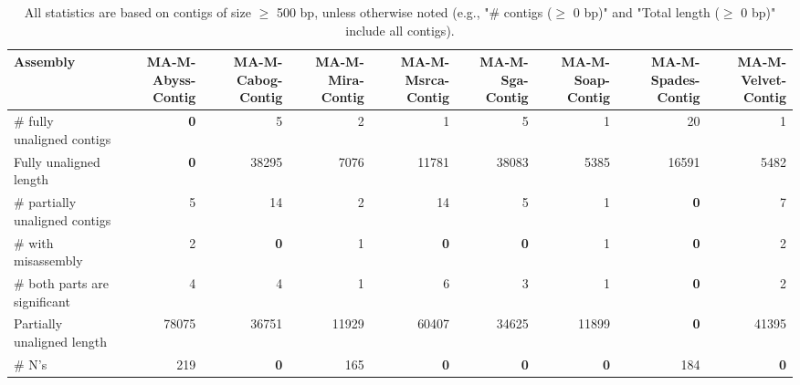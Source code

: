 \documentclass[12pt,a4paper]{article}
\begin{document}
\begin{table}[ht]
\begin{center}
\caption{All statistics are based on contigs of size $\geq$ 500 bp, unless otherwise noted (e.g., "\# contigs ($\geq$ 0 bp)" and "Total length ($\geq$ 0 bp)" include all contigs).}
\begin{tabular}{|l*{8}{|r}|}
\hline
Assembly & MA-M-Abyss-Contig & MA-M-Cabog-Contig & MA-M-Mira-Contig & MA-M-Msrca-Contig & MA-M-Sga-Contig & MA-M-Soap-Contig & MA-M-Spades-Contig & MA-M-Velvet-Contig \\ \hline
\# fully unaligned contigs & {\bf 0} & 5 & 2 & 1 & 5 & 1 & 20 & 1 \\ \hline
Fully unaligned length & {\bf 0} & 38295 & 7076 & 11781 & 38083 & 5385 & 16591 & 5482 \\ \hline
\# partially unaligned contigs & 5 & 14 & 2 & 14 & 5 & 1 & {\bf 0} & 7 \\ \hline
\hspace{5mm}\# with misassembly & 2 & {\bf 0} & 1 & {\bf 0} & {\bf 0} & 1 & {\bf 0} & 2 \\ \hline
\hspace{5mm}\# both parts are significant & 4 & 4 & 1 & 6 & 3 & 1 & {\bf 0} & 2 \\ \hline
Partially unaligned length & 78075 & 36751 & 11929 & 60407 & 34625 & 11899 & {\bf 0} & 41395 \\ \hline
\# N's & 219 & {\bf 0} & 165 & {\bf 0} & {\bf 0} & {\bf 0} & 184 & {\bf 0} \\ \hline
\end{tabular}
\end{center}
\end{table}
\end{document}
